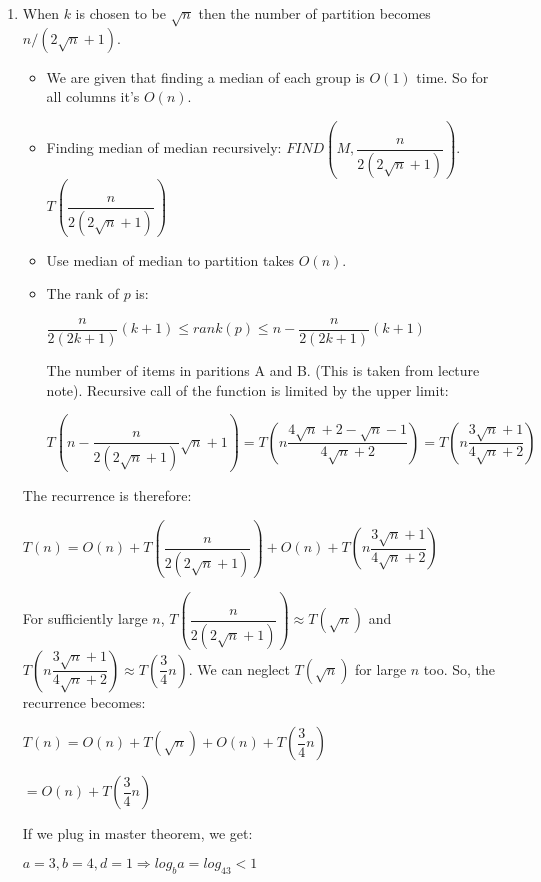\documentclass{article}
\begin{document}
\begin{enumerate}
\begin{lstlisting}
  \end{lstlisting}
  \item When $k$ is chosen to be $\sqrt{n}$ then the number of partition becomes $n/(2\sqrt{n}+1)$.
  
  \begin{itemize}
    \item We are given that finding a median of each group is $O(1)$ time. So for all columns it's $O(n)$.
    \item Finding median of median recursively: $FIND(M,\dfrac{n}{2(2\sqrt{n}+1)})$. $T(\dfrac{n}{2(2\sqrt{n}+1)})$
    \item Use median of median to partition takes $O(n)$.
    \item The rank of $p$ is:
    \begin{center}
      $\dfrac{n}{2(2k+1)}(k+1)\leq rank(p) \leq n-\dfrac{n}{2(2k+1)}(k+1)$
    \end{center}

    The number of items in paritions A and B. (This is taken from lecture note).
    Recursive call of the function is limited by the upper limit:
    
    \begin{center}
      $T(n-\dfrac{n}{2(2\sqrt{n}+1)}\sqrt{n}+1)=T(n\dfrac{4\sqrt{n}+2-\sqrt{n}-1}{4\sqrt{n}+2})=T(n\dfrac{3\sqrt{n}+1}{4\sqrt{n}+2})$
    \end{center}

  \end{itemize}

  The recurrence is therefore:

  \begin{center}
    $T(n)=O(n)+T(\dfrac{n}{2(2\sqrt{n}+1)})+O(n)+T(n\dfrac{3\sqrt{n}+1}{4\sqrt{n}+2})$
  \end{center}

  For sufficiently large $n$, $T(\dfrac{n}{2(2\sqrt{n}+1)})\approx T(\sqrt{n})$ and $T(n\dfrac{3\sqrt{n}+1}{4\sqrt{n}+2})\approx T(\dfrac{3}{4}n)$.
  We can neglect $T(\sqrt{n})$ for large $n$ too.
  So, the recurrence becomes:

  \begin{center}
    $T(n)=O(n)+T(\sqrt{n})+O(n)+T(\dfrac{3}{4}n)$

    $=O(n)+T(\dfrac{3}{4}n)$
  \end{center}

  If we plug in master theorem, we get:

  $a=3, b=4, d=1 \Rightarrow log_ba=log_43<1$


\end{enumerate}
\end{document}
